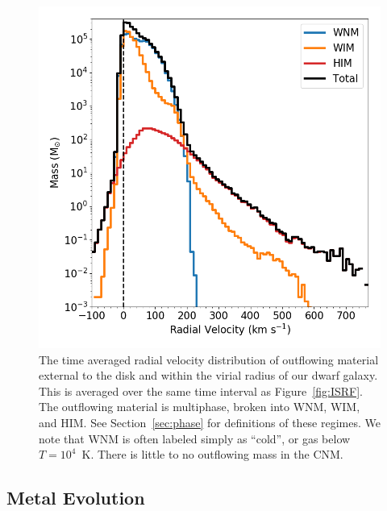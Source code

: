 \documentclass[fleqn,usenatbib,useAMS]{mnras}
\begin{document}
\begin{figure}
\includegraphics[width=0.95\linewidth]{velocity_distribution_time_average}
\caption{The time averaged radial velocity distribution of outflowing material external to the disk and within the virial radius of our dwarf galaxy. This is averaged over the same time interval as Figure~\ref{fig:ISRF}. The outflowing material is multiphase, broken into WNM, WIM, and HIM. See Section~\ref{sec:phase} for definitions of these regimes. We note that WNM is often labeled simply as ``cold'', or gas below $T = 10^{4}$~K. There is little to no outflowing mass in the CNM.}
\label{fig:outflow_velocity}
\end{figure}

\subsection{Metal Evolution} 
\label{sec:chemical evolution}
\end{document}
